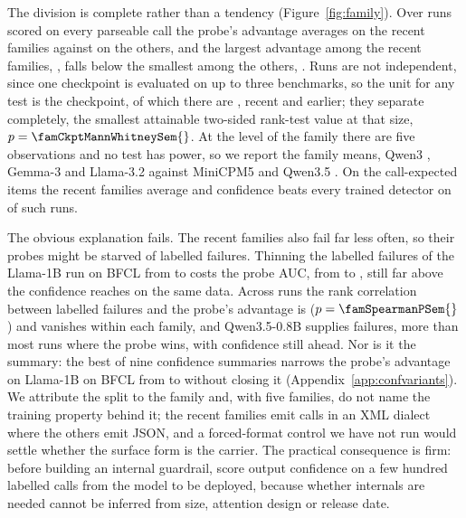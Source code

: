 The division is complete rather than a tendency (Figure~\ref{fig:family}). Over \famNRunsSem{} runs scored
on every parseable call the probe's advantage averages \famGapRecentSem{} on the recent families against
\famGapEarlierSem{} on the others, and the largest advantage among the recent families,
\famRecentMaxSem{}, falls below the smallest among the others, \famEarlierMinSem{}. Runs are not
independent, since one checkpoint is evaluated on up to three benchmarks, so the unit for any test is the
checkpoint, of which there are \famNCkptSem{}, \famNCkptRecentSem{} recent and \famNCkptEarlierSem{}
earlier; they separate completely, the smallest attainable two-sided rank-test value at that size,
$p=\famCkptMannWhitneySem{}$. At the level of the family there are five observations and no test has power,
so we report the family means, Qwen3 \famGapQwenThreeSem{}, Gemma-3 \famGapGemmaThreeSem{} and Llama-3.2
\famGapLlamaThreeTwoSem{} against MiniCPM5 \famGapMiniCPMFiveSem{} and Qwen3.5 \famGapQwenThreeFiveSem{}. On
the call-expected items the recent families average \famGapRecentCall{} and confidence beats every trained
detector on \famConfWinsCall{} of \famNRecentCall{} such runs.

The obvious explanation fails. The recent families also fail far less often, so their probes might be
starved of labelled failures. Thinning the labelled failures of the Llama-1B run on BFCL from
\curveBaseLlamaOneBBfclFullPos{} to \curveBaseLlamaOneBBfclLowPos{} costs the probe
\curveBaseLlamaOneBBfclDrop{} AUC, from \curveBaseLlamaOneBBfclFull{} to \curveBaseLlamaOneBBfclLow{}, still
far above the \confBaseLlamaOneBBfcl{} confidence reaches on the same data. Across runs the rank correlation
between labelled failures and the probe's advantage is
\famSpearmanSem{} ($p=\famSpearmanPSem{}$) and vanishes within each family, and Qwen3.5-0.8B supplies
\posQwenSmallBfclCount{} failures, more than most runs where the probe wins, with confidence still ahead. Nor
is it the summary: the best of nine confidence summaries narrows the probe's advantage on Llama-1B on BFCL
from \CvLlamaBfclGapMean{} to \CvLlamaBfclGapBest{} without closing it (Appendix~\ref{app:confvariants}). We
attribute the split to the family and, with five families, do not name the training property behind it; the
recent families emit calls in an XML dialect where the others emit JSON, and a forced-format control we have
not run would settle whether the surface form is the carrier. The practical consequence is firm: before
building an internal guardrail, score output confidence on a few hundred labelled calls from the model to be
deployed, because whether internals are needed cannot be inferred from size, attention design or release
date.

